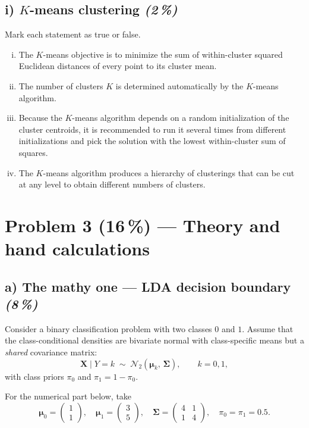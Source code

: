 \documentclass[11pt,a4paper]{article}
\newcommand{\points}[1]{\textbf{(#1\,\%)}}
\newcommand{\subpoints}[1]{\textit{(#1\,\%)}}
\begin{document}
\subsection*{i) $K$-means clustering \subpoints{2}}
Mark each statement as true or false.
\begin{enumerate}[(i)]
  \item The $K$-means objective is to minimize the sum of within-cluster squared Euclidean distances of every point to its cluster mean.
  \item The number of clusters $K$ is determined automatically by the $K$-means algorithm.
  \item Because the $K$-means algorithm depends on a random initialization of the cluster centroids, it is recommended to run it several times from different initializations and pick the solution with the lowest within-cluster sum of squares.
  \item The $K$-means algorithm produces a hierarchy of clusterings that can be cut at any level to obtain different numbers of clusters.
\end{enumerate}

\vfill\eject

\section*{Problem 3 \points{16} --- Theory and hand calculations}

\subsection*{a) The mathy one --- LDA decision boundary \subpoints{8}}

Consider a binary classification problem with two classes $0$ and $1$. Assume that the class-conditional densities are bivariate normal with class-specific means but a \emph{shared} covariance matrix:
$$\mathbf{X} \mid Y=k \;\sim\; \mathcal{N}_2(\boldsymbol\mu_k,\, \boldsymbol\Sigma), \qquad k = 0, 1,$$
with class priors $\pi_0$ and $\pi_1 = 1-\pi_0$.

For the numerical part below, take
$$\boldsymbol\mu_0 = \begin{pmatrix}1\\1\end{pmatrix}, \quad
  \boldsymbol\mu_1 = \begin{pmatrix}3\\5\end{pmatrix}, \quad
  \boldsymbol\Sigma = \begin{pmatrix}4 & 1\\1 & 4\end{pmatrix}, \quad
  \pi_0 = \pi_1 = 0.5.$$
\end{document}
